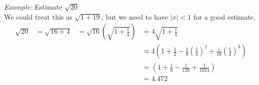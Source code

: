 \documentclass[12pt]{article}
\begin{document}
{\sl Example:} Estimate $\sqrt{20}$\\
We could treat this as $\sqrt{1+19}$, but we need to have $|x|<1$ for a good estimate.
\begin{align*}
    \sqrt{20} &= \sqrt{16+4} &= \sqrt{16}\left(\sqrt{1+\frac{1}{4}}\right) &=4\sqrt{1+\frac{1}{4}}\\
    &&&\approx 4\left(1+\frac{1}{2}-\frac{1}{8}\left(\frac{1}{4}\right)^2+\frac{1}{16}\left(\frac{1}{4}\right)^3\right)\\
    &&&=\left(1+\frac{1}{8}-\frac{1}{128}+\frac{1}{1024}\right)\\
    &&&=4.472
\end{align*}
\end{document}
